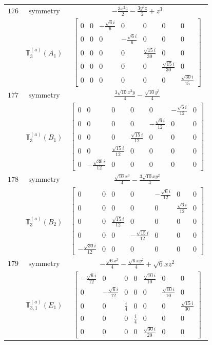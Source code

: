 \documentclass[fleqn,8pt,landscape]{jsarticle}
\begin{document}
\begin{longtable}{ccc}
$ 176 $ & $ \text{symmetry} $ & $ - \frac{3 x^{2} z}{2} - \frac{3 y^{2} z}{2} + z^{3} $ \\
$  $ & $ \mathbb{T}_{3}^{(a)}(A_{1}) $ & $ \begin{bmatrix} 0 & 0 & - \frac{\sqrt{6} i}{6} & 0 & 0 & 0 & 0 \\ 0 & 0 & 0 & - \frac{\sqrt{6} i}{6} & 0 & 0 & 0 \\ 0 & 0 & 0 & 0 & \frac{\sqrt{15} i}{30} & 0 & 0 \\ 0 & 0 & 0 & 0 & 0 & \frac{\sqrt{15} i}{30} & 0 \\ 0 & 0 & 0 & 0 & 0 & 0 & \frac{\sqrt{30} i}{15} \end{bmatrix} $ \\ \hline
$ 177 $ & $ \text{symmetry} $ & $ \frac{3 \sqrt{10} x^{2} y}{4} - \frac{\sqrt{10} y^{3}}{4} $ \\
$  $ & $ \mathbb{T}_{3}^{(a)}(B_{1}) $ & $ \begin{bmatrix} 0 & 0 & 0 & 0 & 0 & - \frac{\sqrt{6} i}{12} & 0 \\ 0 & 0 & 0 & 0 & - \frac{\sqrt{6} i}{12} & 0 & 0 \\ 0 & 0 & 0 & \frac{\sqrt{15} i}{12} & 0 & 0 & 0 \\ 0 & 0 & \frac{\sqrt{15} i}{12} & 0 & 0 & 0 & 0 \\ 0 & - \frac{\sqrt{30} i}{12} & 0 & 0 & 0 & 0 & 0 \end{bmatrix} $ \\ \hline
$ 178 $ & $ \text{symmetry} $ & $ \frac{\sqrt{10} x^{3}}{4} - \frac{3 \sqrt{10} x y^{2}}{4} $ \\
$  $ & $ \mathbb{T}_{3}^{(a)}(B_{2}) $ & $ \begin{bmatrix} 0 & 0 & 0 & 0 & - \frac{\sqrt{6} i}{12} & 0 & 0 \\ 0 & 0 & 0 & 0 & 0 & \frac{\sqrt{6} i}{12} & 0 \\ 0 & 0 & \frac{\sqrt{15} i}{12} & 0 & 0 & 0 & 0 \\ 0 & 0 & 0 & - \frac{\sqrt{15} i}{12} & 0 & 0 & 0 \\ - \frac{\sqrt{30} i}{12} & 0 & 0 & 0 & 0 & 0 & 0 \end{bmatrix} $ \\ \hline
$ 179 $ & $ \text{symmetry} $ & $ - \frac{\sqrt{6} x^{3}}{4} - \frac{\sqrt{6} x y^{2}}{4} + \sqrt{6} x z^{2} $ \\
$  $ & $ \mathbb{T}_{3,1}^{(a)}(E_{1}) $ & $ \begin{bmatrix} - \frac{\sqrt{6} i}{12} & 0 & 0 & 0 & \frac{\sqrt{10} i}{10} & 0 & 0 \\ 0 & - \frac{\sqrt{6} i}{12} & 0 & 0 & 0 & \frac{\sqrt{10} i}{10} & 0 \\ 0 & 0 & \frac{i}{4} & 0 & 0 & 0 & \frac{\sqrt{15} i}{30} \\ 0 & 0 & 0 & \frac{i}{4} & 0 & 0 & 0 \\ 0 & 0 & 0 & 0 & \frac{\sqrt{30} i}{20} & 0 & 0 \end{bmatrix} $ \\ \hline

\end{longtable}
\end{document}
